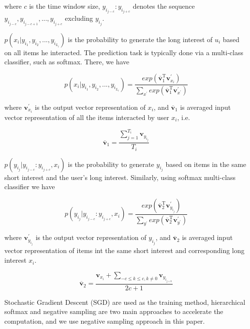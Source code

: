 \documentclass{llncs}
\begin{document}
where $c$ is the time window size, $y_{i_{j-c}} : y_{i_{j+c}}$ denotes the sequence
$y_{i_{j-c}}, y_{i_{j-c+1}}, ..., y_{i_{j+c}}$ excluding $y_{i_j}$.

$p(x_i | y_{i_1}, y_{i_2}, ..., y_{i_{L_i}})$ is the probability to generate
the long interest of $u_i$ based on all items he interacted.
The prediction task is typically done via a multi-class classifier,
such as softmax. There, we have

\begin{equation}
p(x_i | y_{i_1}, y_{i_2}, ..., y_{i_{L_i}}) =
\frac
{
	exp ( \overline{\mathbf{v}}_{1}^{\mathrm{T}} \mathbf{v}_{x_i}^{'} )
}
{
	\sum_{x^{'}} exp ( \overline{\mathbf{v}}_{1}^{\mathrm{T}} \mathbf{v}_{x^{'}}^{'} )
}
\end{equation}

where $\mathbf{v}_{x_i}^{'}$ is the output vector representation of $x_i$,
and $\overline{\mathbf{v}}_{1}$ is averaged input vector representation of all the items
interacted by user $x_i$, i.e.

\begin{equation}
\overline{\mathbf{v}}_{1} = \frac{\sum_{j=1}^{T_i} \mathbf{v}_{y_{i_j}}}{T_i}
\end{equation}

$p(y_{i_j} | y_{i_{j-c}} : y_{i_{j+c}}, x_i)$
is the probability to generate $y_{i_j}$ based on items in the same short interest
and the user's long interest. Similarly, using softmax multi-class classifier we have

\begin{equation}
p(y_{i_j} | y_{i_{j-c}} : y_{i_{j+c}}, x_i) =
\frac
{
	exp( \overline{\mathbf{v}}_{2}^{\mathrm{T}} \mathbf{v}_{y_{i_j}}^{'} )
}
{
	\sum_{y^{'}} exp( \overline{\mathbf{v}}_{2}^{\mathrm{T}} \mathbf{v}_{y^{'}}^{'} )
}
\end{equation}

where $\mathbf{v}_{y_{i_j}}^{'}$ is the output vector representation of $y_{i_j}$,
and $\overline{\mathbf{v}}_{2}$ is averaged input vector representation of items
int the same short interest and corresponding long interest $x_i$.

\begin{equation}
\overline{\mathbf{v}}_{2} = \frac{
	\mathbf{v}_{x_i} + 
	\sum_{-c \leq k \leq c, k \not= 0}{\mathbf{v}_{y_{i_{j+k}}}}
}{2c+1}
\end{equation}

Stochastic Gradient Descent (SGD) are used as the training method,
hierarchical softmax and negative sampling are two main approaches to accelerate
the computation, and we use negative sampling approach in this paper.
\end{document}
